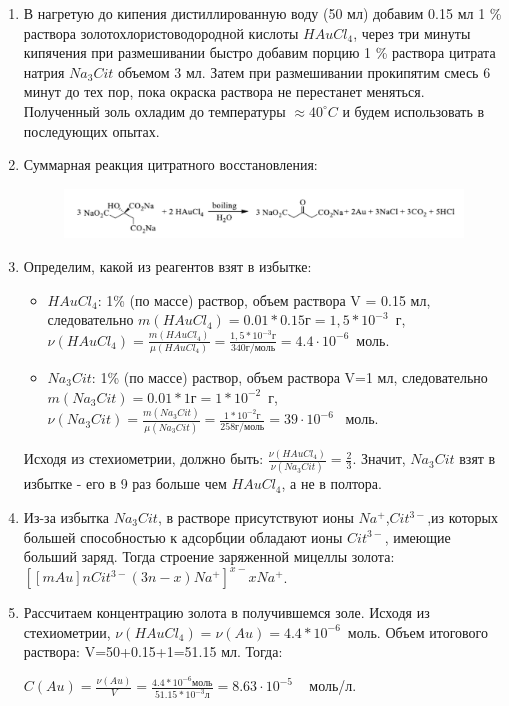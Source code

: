 \documentclass[a4paper,12pt]{article}
\begin{document}
\begin{enumerate}
    \item В нагретую до кипения дистиллированную воду (50 мл) добавим 0.15 мл 1 \% раствора золотохлористоводородной кислоты $HAuCl_4$, через три минуты кипячения при размешивании быстро добавим порцию 1 \% раствора цитрата натрия $Na_3Cit$ объемом 3 мл. Затем при размешивании прокипятим смесь 6 минут до тех пор, пока окраска раствора не перестанет меняться. Полученный золь охладим до температуры $\approx 40^{\circ} C$ и будем использовать в последующих опытах.
    
    \item Суммарная реакция цитратного восстановления:

\begin{figure}[h!]
    \centering
    \includegraphics[scale = 0.35]{react.png}
\end{figure}

    \item Определим, какой из реагентов взят в избытке:
\begin{itemize}
    \item $HAuCl_4$: 1\% (по массе) раствор, объем раствора V = 0.15 мл, следовательно $m(HAuCl_4) = 0.01 * 0.15 г = 1,5*10^{-3}$~г, $\nu(HAuCl_4) = \frac{m(HAuCl_4 )}{\mu(HAuCl_4)}=\frac{1,5*10^{-3}г}{340 г/моль}= 4.4 \cdot 10^{-6}$~моль.
    \item $Na_3Cit$: 1\% (по массе) раствор, объем раствора V=1 мл, следовательно  $m(Na_3Cit) = 0.01*1 г=1*10^{-2}$~г, $\nu(Na_3 Cit) =  \frac{m(Na_3Cit)}{\mu(Na_3 Cit)} =\frac{1*10^{-2}  \text{г} }{258 \text{г/моль}}= 39\cdot 10^{-6}$ ~моль.
\end{itemize}

Исходя из стехиометрии, должно быть: $\frac{\nu(HAuCl_4 )}{\nu(Na_3 Cit)}=  \frac{2}{3}$.
Значит, $Na_3Cit$ взят в избытке -  его в 9 раз больше чем $HAuCl_4$,  а не в полтора.
    \item  Из-за избытка $Na_3Cit$, в растворе присутствуют ионы $Na^{+}$,$Cit^{3-}$,из которых большей способностью к адсорбции обладают ионы  $Cit^{3-}$, имеющие больший заряд. Тогда строение заряженной мицеллы золота:
$[[mAu]nCit^{3-} (3n-x) Na^{+}]^{x-} xNa^{+}$.
   
\item Рассчитаем концентрацию золота в получившемся золе.
Исходя из стехиометрии, $\nu(HAuCl_4)=\nu(Au)=4.4*10^{-6}$~моль.
Объем итогового раствора: V=50+0.15+1=51.15 мл. Тогда:

$C(Au)=\frac{\nu(Au)}{V}=\frac{4.4*10^{-6}  моль}{51.15*10^{-3} л}  =8.63\cdot10^{-5}$ ~  моль/л.


\end{enumerate}  
\end{document}
